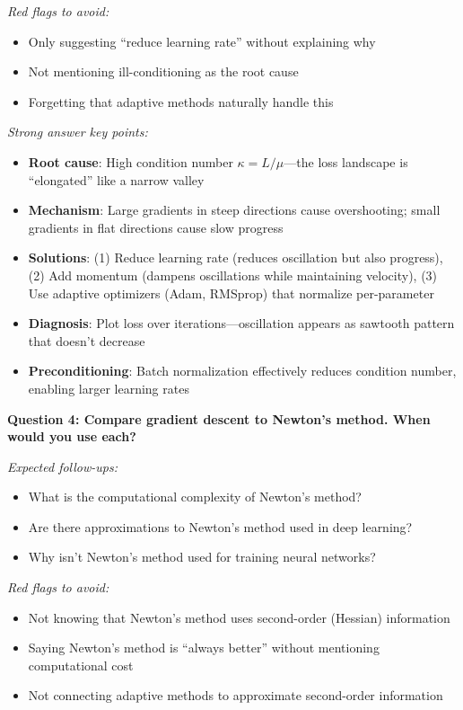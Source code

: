 \documentclass[../../main.tex]{subfiles}
\begin{document}
\begin{interviewquestions}
\textit{Red flags to avoid:}
\begin{itemize}
    \item Only suggesting ``reduce learning rate'' without explaining why
    \item Not mentioning ill-conditioning as the root cause
    \item Forgetting that adaptive methods naturally handle this
\end{itemize}

\textit{Strong answer key points:}
\begin{itemize}
    \item \textbf{Root cause}: High condition number $\kappa = L/\mu$---the loss landscape is ``elongated'' like a narrow valley
    \item \textbf{Mechanism}: Large gradients in steep directions cause overshooting; small gradients in flat directions cause slow progress
    \item \textbf{Solutions}: (1) Reduce learning rate (reduces oscillation but also progress), (2) Add momentum (dampens oscillations while maintaining velocity), (3) Use adaptive optimizers (Adam, RMSprop) that normalize per-parameter
    \item \textbf{Diagnosis}: Plot loss over iterations---oscillation appears as sawtooth pattern that doesn't decrease
    \item \textbf{Preconditioning}: Batch normalization effectively reduces condition number, enabling larger learning rates
\end{itemize}

\vspace{0.5em}
\textbf{Question 4: Compare gradient descent to Newton's method. When would you use each?}

\textit{Expected follow-ups:}
\begin{itemize}
    \item What is the computational complexity of Newton's method?
    \item Are there approximations to Newton's method used in deep learning?
    \item Why isn't Newton's method used for training neural networks?
\end{itemize}

\textit{Red flags to avoid:}
\begin{itemize}
    \item Not knowing that Newton's method uses second-order (Hessian) information
    \item Saying Newton's method is ``always better'' without mentioning computational cost
    \item Not connecting adaptive methods to approximate second-order information
\end{itemize}


\end{interviewquestions}
\end{document}
